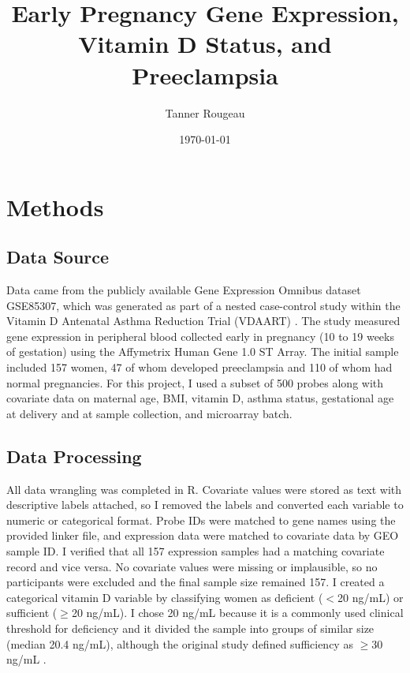 \documentclass[11pt]{article}
\title{Early Pregnancy Gene Expression, Vitamin D Status, and Preeclampsia}
\author{Tanner Rougeau}
\date{\today}
\begin{document}
\maketitle

\section{Methods}

\subsection{Data Source}
Data came from the publicly available Gene Expression Omnibus dataset GSE85307, which was generated as part of a nested case-control study within the Vitamin D Antenatal Asthma Reduction Trial (VDAART) \citep{mirzakhani2016}. The study measured gene expression in peripheral blood collected early in pregnancy (10 to 19 weeks of gestation) using the Affymetrix Human Gene 1.0 ST Array. The initial sample included 157 women, 47 of whom developed preeclampsia and 110 of whom had normal pregnancies. For this project, I used a subset of 500 probes along with covariate data on maternal age, BMI, vitamin D, asthma status, gestational age at delivery and at sample collection, and microarray batch.

\subsection{Data Processing}
All data wrangling was completed in R. Covariate values were stored as text with descriptive labels attached, so I removed the labels and converted each variable to numeric or categorical format. Probe IDs were matched to gene names using the provided linker file, and expression data were matched to covariate data by GEO sample ID. I verified that all 157 expression samples had a matching covariate record and vice versa. No covariate values were missing or implausible, so no participants were excluded and the final sample size remained 157. I created a categorical vitamin D variable by classifying women as deficient ($<$20 ng/mL) or sufficient ($\geq$20 ng/mL). I chose 20 ng/mL because it is a commonly used clinical threshold for deficiency and it divided the sample into groups of similar size (median 20.4 ng/mL), although the original study defined sufficiency as $\geq$30 ng/mL \citep{mirzakhani2016}.
\end{document}
